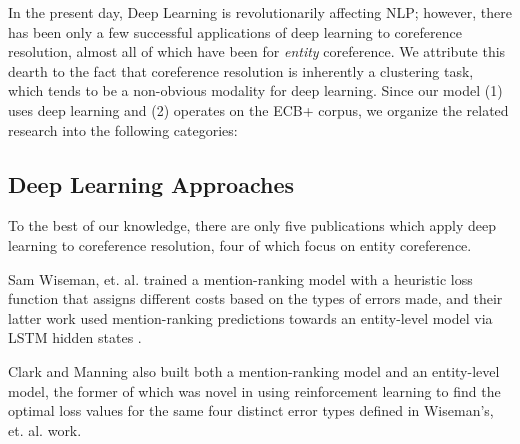 \documentclass[11pt,a4paper]{article}
\begin{document}

In the present day, Deep Learning is revolutionarily affecting NLP; however, there has been only a few successful applications of deep learning to coreference resolution, almost all of which have been for \textit{entity} coreference.  We attribute this dearth to the fact that coreference resolution is inherently a clustering task, which tends to be a non-obvious modality for deep learning.  Since our model (1) uses deep learning and (2) operates on the ECB+ corpus, we organize the related research into the following categories:

\subsection{Deep Learning Approaches}
To the best of our knowledge, there are only five publications which apply deep learning to coreference resolution, four of which focus on entity coreference.

Sam Wiseman, et. al.  trained a mention-ranking model with a heuristic loss function that assigns different costs based on the types of errors made, and their latter work used mention-ranking predictions towards an entity-level model via LSTM hidden states \cite{Hochreiter:1997:LSM:1246443.1246450}.

Clark and Manning  also built both a mention-ranking model and an entity-level model, the former of which was novel in using reinforcement learning to find the optimal loss values for the same four distinct error types defined in Wiseman's, et. al.  work.
\end{document}
